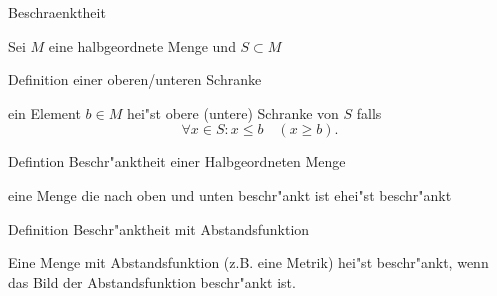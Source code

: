 \documentclass[class=article, crop=false]{standalone}
\begin{document}
\begin{zettel}{Beschraenktheit}

    Sei $M$ eine halbgeordnete Menge und $S \subset M$ 
    
\begin{flashcard}
\begin{question}
    Definition einer oberen/unteren Schranke
\end{question}
    \begin{definition}
        ein Element $b \in  M$ hei"st obere (untere) Schranke von $S$ falls
\[
\forall x \in  S : x \leq b \quad ( x \geq b)
.\]

    \end{definition}
\end{flashcard}


\begin{flashcard}
\begin{question}
    Defintion Beschr"anktheit einer Halbgeordneten Menge
\end{question}
    \begin{definition}
        eine Menge die nach oben und unten beschr"ankt ist ehei"st beschr"ankt
    \end{definition}
\end{flashcard}

\begin{flashcard}
\begin{question}
    Definition Beschr"anktheit mit Abstandsfunktion
\end{question}
\begin{definition}
    Eine Menge mit Abstandsfunktion (z.B. eine Metrik) hei"st beschr"ankt, wenn das Bild der Abstandsfunktion beschr"ankt ist.
\end{definition}
\end{flashcard}

\end{zettel}
\end{document}
